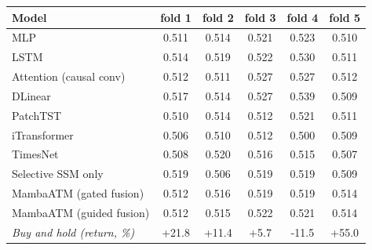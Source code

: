 {\scriptsize
\setlength{\tabcolsep}{2pt}
\begin{tabular}{lccccc}
\toprule
\textbf{Model} & \textbf{fold 1} & \textbf{fold 2} & \textbf{fold 3} & \textbf{fold 4} & \textbf{fold 5} \\
\midrule
MLP & 0.511 & 0.514 & 0.521 & 0.523 & 0.510 \\
LSTM & 0.514 & 0.519 & 0.522 & 0.530 & 0.511 \\
Attention (causal conv) & 0.512 & 0.511 & 0.527 & 0.527 & 0.512 \\
DLinear & 0.517 & 0.514 & 0.527 & 0.539 & 0.509 \\
PatchTST & 0.510 & 0.514 & 0.512 & 0.521 & 0.511 \\
iTransformer & 0.506 & 0.510 & 0.512 & 0.500 & 0.509 \\
TimesNet & 0.508 & 0.520 & 0.516 & 0.515 & 0.507 \\
Selective SSM only & 0.519 & 0.506 & 0.519 & 0.519 & 0.509 \\
MambaATM (gated fusion) & 0.512 & 0.516 & 0.519 & 0.519 & 0.514 \\
MambaATM (guided fusion) & 0.512 & 0.515 & 0.522 & 0.521 & 0.514 \\
\midrule
\emph{Buy and hold (return, \%)} & +21.8 & +11.4 & +5.7 & -11.5 & +55.0 \\
\bottomrule
\end{tabular}
}
